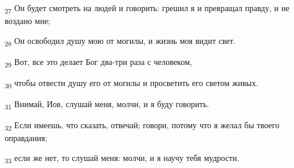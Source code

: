 \begin{tcolorbox}
\textsubscript{27} Он будет смотреть на людей и говорить: грешил я и превращал правду, и не воздано мне;
\end{tcolorbox}
\begin{tcolorbox}
\textsubscript{28} Он освободил душу мою от могилы, и жизнь моя видит свет.
\end{tcolorbox}
\begin{tcolorbox}
\textsubscript{29} Вот, все это делает Бог два-три раза с человеком,
\end{tcolorbox}
\begin{tcolorbox}
\textsubscript{30} чтобы отвести душу его от могилы и просветить его светом живых.
\end{tcolorbox}
\begin{tcolorbox}
\textsubscript{31} Внимай, Иов, слушай меня, молчи, и я буду говорить.
\end{tcolorbox}
\begin{tcolorbox}
\textsubscript{32} Если имеешь, что сказать, отвечай; говори, потому что я желал бы твоего оправдания;
\end{tcolorbox}
\begin{tcolorbox}
\textsubscript{33} если же нет, то слушай меня: молчи, и я научу тебя мудрости.
\end{tcolorbox}
